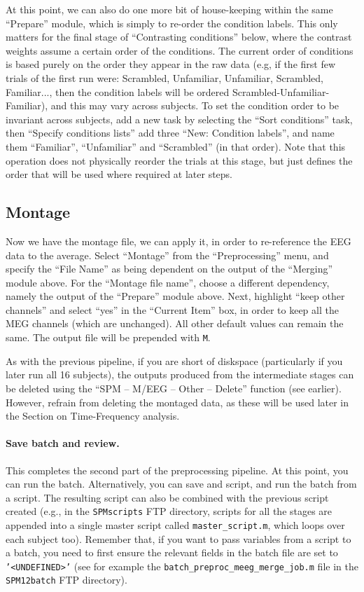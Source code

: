At this point, we can also do one more bit of house-keeping within the same ``Prepare'' module, which is simply to re-order the condition labels. This only matters for the final stage of ``Contrasting conditions'' below, where the contrast weights assume a certain order of the conditions. The current order of conditions is based purely on the order they appear in the raw data (e.g, if the first few trials of the first run were: Scrambled, Unfamiliar, Unfamiliar, Scrambled, Familiar..., then the condition labels will be ordered Scrambled-Unfamiliar-Familiar), and this may vary across subjects. To set the condition order to be invariant across subjects, add a new task by selecting the ``Sort conditions'' task, then ``Specify conditions lists'' add three ``New: Condition labels'', and name them ``Familiar'', ``Unfamiliar'' and ``Scrambled'' (in that order). Note that this operation does not physically reorder the trials at this stage, but just defines the order that will be used where required at later steps.

\subsection{Montage}

Now we have the montage file, we can apply it, in order to re-reference the EEG data to the average. Select ``Montage'' from the ``Preprocessing'' menu, and specify the ``File Name'' as being dependent on the output of the ``Merging'' module above. For the ``Montage file name'', choose a different dependency, namely the output of the ``Prepare'' module above. Next, highlight ``keep other channels'' and select ``yes'' in the ``Current Item'' box, in order to keep all the MEG channels (which are unchanged). All other default values can remain the same. The output file will be prepended with \texttt{M}.

As with the previous pipeline, if you are short of diskspace (particularly if you later run all 16 subjects), the outputs produced from the intermediate stages can be deleted using the ``SPM -- M/EEG -- Other -- Delete'' function (see earlier). However, refrain from deleting the montaged data, as these will be used later in the Section on Time-Frequency analysis.

\paragraph{Save batch and review.}

This completes the second part of the preprocessing pipeline. At this point, you can run the batch. Alternatively, you can save and script, and run the batch from a script. The resulting script can also be combined with the previous script created (e.g., in the \texttt{SPMscripts} FTP directory, scripts for all the stages are appended into a single master script called \texttt{master\_script.m}, which loops over each subject too). Remember that, if you want to pass variables from a script to a batch, you need to first ensure the relevant fields in the batch file are set to \texttt{'<UNDEFINED>'} (see for example the \texttt{batch\_preproc\_meeg\_merge\_job.m} file in the \texttt{SPM12batch} FTP directory).
 
